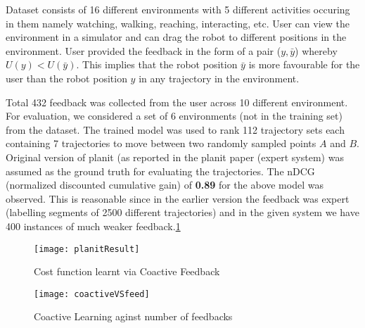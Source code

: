 		Dataset consists of 16 different environments with 5 different activities occuring in them namely watching, walking, reaching, interacting, etc. User can view the environment in a simulator and can drag the robot to different positions in the environment. User provided the feedback in the form of a pair ($y,\bar{y}$) whereby $U(y) < U(\bar{y})$. This implies that the robot position $\bar{y}$ is more favourable for the user than the robot position $y$ in any trajectory in the environment. 

		Total 432 feedback was collected from the user across 10 different environment. For evaluation, we considered a set of 6 environments (not in the training set) from the dataset. The trained model was used to rank 112 trajectory sets each containing 7 trajectories to move between two randomly sampled points $A$ and $B$. Original version of planit (as reported in the planit paper (expert system) was assumed as the ground truth for evaluating the trajectories. The nDCG (normalized discounted cumulative gain) of \textbf{0.89} for the above model was observed. This is reasonable since in the earlier version the feedback was expert (labelling segments of 2500 different trajectories) and in the given system we have 400 instances of much weaker feedback.\ref{fig:planitResult} 


		
		\begin{figure}[h]
		\texttt{[image: planitResult]}
		\centering
		\caption{Cost function learnt via Coactive Feedback}
  		\label{fig:planitResult}
		\end{figure}


		\begin{figure}[h]
		\texttt{[image: coactiveVSfeed]}
		\centering
		\caption{Coactive Learning aginst number of feedbacks}
  		\label{fig:c1}
		\end{figure}
